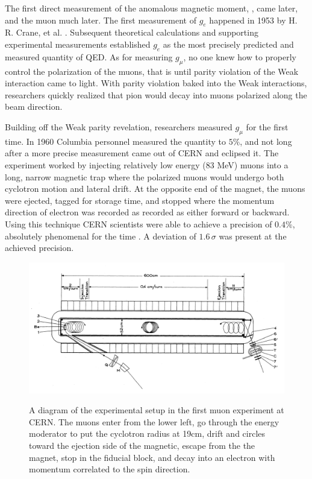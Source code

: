 The first direct measurement of the anomalous magnetic moment, \gmtwo, came later, and the muon \gmtwo much later.  The first measurement of $g_e$ happened in 1953 by H. R. Crane, et al. .  Subsequent theoretical calculations and supporting experimental measurements established $g_e$ as the most precisely predicted and measured quantity of QED.  As for measuring $g_\mu$, no one knew how to properly control the polarization of the muons, that is until parity violation of the Weak interaction came to light.  With parity violation baked into the Weak interactions, researchers quickly realized that pion would decay into muons polarized along the beam direction.  

Building off the Weak parity revelation, researchers measured $g_\mu$ for the first time.  In 1960 Columbia personnel measured the quantity to $5\%$, and not long after a more precise measurement came out of CERN and eclipsed it.  The experiment worked by injecting relatively low energy (83 MeV) muons into a long, narrow magnetic trap where the polarized muons would undergo both cyclotron motion and lateral drift. At the opposite end of the magnet, the muons were ejected, tagged for storage time, and stopped where the momentum direction of electron was recorded as recorded as either forward or backward.  Using this technique CERN scientists were able to achieve a precision of $0.4\%$, absolutely phenomenal for the time \cite{cern-i}.  A deviation of $1.6\,\sigma$ was present at the achieved precision.

\begin{figure}
\centering
\includegraphics[width=0.9\linewidth]{fig/cern-i-diagram.png}
\label{fig:cern-i}
\caption{A diagram of the experimental setup in the first muon \gmtwo experiment at CERN. The muons enter from the lower left, go through the energy moderator to put the cyclotron radius at 19cm, drift and circles toward the ejection side of the magnetic, escape from the the magnet, stop in the fiducial block, and decay into an electron with momentum correlated to the spin direction.}
\end{figure}

